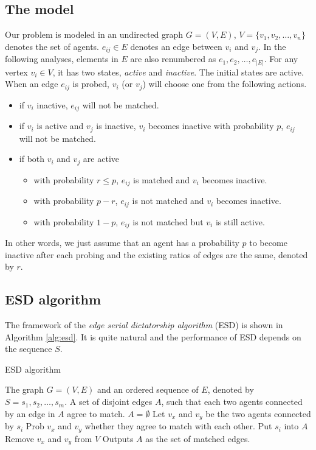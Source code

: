 \documentclass[letterpaper]{article}
\begin{document}
\subsection{The model}

Our problem is modeled in an undirected graph $G=(V,E)$, $V=\{v_1,v_2,\ldots,v_n\}$ denotes the set of agents. $e_{ij}\in E$ denotes an edge between $v_i$ and $v_j$. In the following analyses, elements in $E$ are also renumbered as $e_1,e_2,\ldots,e_{|E|}$. 
For any vertex $v_i\in V$, it has two states, \textit{active} and \textit{inactive}.
The initial states are active.
When an edge $e_{ij}$ is probed, $v_i$ (or $v_j$) will choose one from the following actions.
\begin{itemize}
	\item if $v_i$ inactive, $e_{ij}$ will not be matched.
	\item if $v_i$ is active and $v_j$ is inactive, $v_i$ becomes inactive with probability $p$, $e_{ij}$ will not be matched.
	\item if both $v_i$ and $v_j$ are active
	\begin{itemize}
		\item with probability $r\leq p$, $e_{ij}$ is matched and $v_i$ becomes inactive.
		\item with probability $p-r$, $e_{ij}$ is not matched and $v_i$ becomes inactive.
		\item with probability $1-p$, $e_{ij}$ is not matched but $v_i$ is still active.
	\end{itemize}
\end{itemize} 

In other words, we just assume that an agent has a probability $p$ to become inactive after each probing and the existing ratios of edges are the same, denoted by $r$.


\subsection{ESD algorithm}

The framework of the \textit{edge serial dictatorship algorithm} (ESD) is shown in Algorithm \ref{alg:esd}.
It is quite natural and the performance of ESD depends on the sequence $S$.

\begin{algorithm}
	\caption{ESD algorithm}
	\label{alg:esd}
	\begin{algorithmic}[1]
		\Require
		The graph $G=(V,E)$ and an ordered sequence of $E$, denoted by $S=s_1,s_2,\ldots,s_m$.
		\Ensure A set of disjoint edges $A$, such that each two agents connected by an edge in $A$ agree to match. 
		\State $A=\emptyset$
		\State Let $v_x$ and $v_y$ be the two agents connected by $s_i$
		\State Prob $v_x$ and $v_y$ whether they agree to match with each other.
		\State Put $s_i$ into $A$
		\State Remove $v_x$ and $v_y$ from $V$
		\EndIf
		\EndIf
		\EndFor
		\State Outputs $A$ as the set of matched edges.
	\end{algorithmic}
\end{algorithm}
\end{document}
